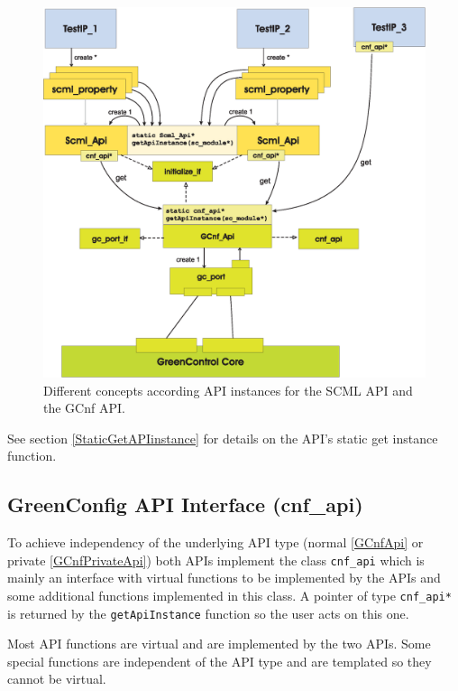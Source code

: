 \begin{figure}%
	\centerline{
		\includegraphics[width=\textwidth]{GreenControlImplMoreApis.eps}}
	\caption{Different concepts according API instances for the SCML API and the GCnf API.}
	\label{fig:GreenControlImplMoreApis}
\end{figure}

See section \ref{StaticGetAPIinstance} for details on the \GreenConfig API's static get instance function.


\subsection{GreenConfig API Interface (cnf\_api)}
\label{GCnfCnfApi}
To achieve independency of the underlying API type (normal \ref{GCnfApi} or private \ref{GCnfPrivateApi}) both APIs implement the class \lstinline|cnf_api| which is mainly an interface with virtual functions to be implemented by the APIs and some additional functions implemented in this class. A pointer of type \lstinline|cnf_api*| is returned by the \lstinline|getApiInstance| function so the user acts on this one.

Most API functions are virtual and are implemented by the two APIs. Some special functions are independent of the API type and are templated so they cannot be virtual.

